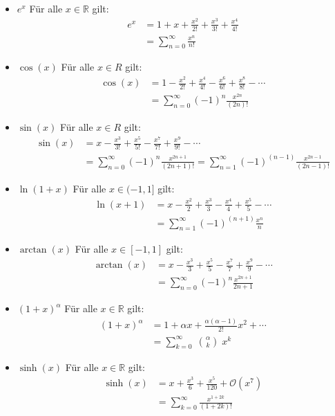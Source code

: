 \documentclass[25pt]{sciposter}
\newcommand{\R}{\mathbb{R}}
\begin{document}
\begin{multicols}{3}
\begin{itemize}
	\item $\boxed{e^x}$ Für alle $x \in \R$ gilt:
	\begin{align*}
		e^x &= 1 + x + \frac{x^2}{2!} + \frac{x^3}{3!} + \frac{x^4}{4!}\\
		&= \sum_{n=0}^{\infty} \frac{x^n}{n!}
	\end{align*}
	
	\item $\boxed{\cos(x)}$ Für alle $x\in R$ gilt:
	\begin{align*}
	\cos(x) &= 1 - \frac{x^2}{2!} + \frac{x^4}{4!} - \frac{x^6}{6!} + \frac{x^8}{8!} - \cdots  \\
	&= \sum_{n=0}^{\infty} (-1)^n \frac{x^{2n}}{(2n)!}
	\end{align*}
	
	\item $\boxed{\sin(x)}$ Für alle $x\in R$ gilt:
	\begin{align*}
	\sin(x) &=  x - \frac{x^3}{3!} + \frac{x^5}{5!} - \frac{x^7}{7!} + \frac{x^9}{9!} - \cdots\\
	&= \sum_{n=0}^{\infty} (-1)^n \frac{x^{2n+1}}{(2n+1)!} = \sum_{n=1}^{\infty} (-1)^{(n-1)} \frac{x^{2n-1}}{(2n-1)!}
	\end{align*}

	\item $\boxed{\ln(1+x)}$ Für alle $x\in (-1,1]$ gilt:
	\begin{align*}
	\ln(x+1) &= x - \frac{x^2}{2} + \frac{x^3}{3} - \frac{x^4}{4} + \frac{x^5}{5}- \cdots \\
	&= \sum_{n=1}^{\infty} (-1)^{(n+1)} \frac{x^n}{n}
	\end{align*}

	\item $\boxed{\arctan(x)}$ Für alle $x\in [-1,1]$ gilt:
	\begin{align*}
	\arctan(x) &= x - \frac{x^3}{3} + \frac{x^5}{5} - \frac{x^7}{7} + \frac{x^9}{9} - \cdots \\
	&= \sum_{n=0}^{\infty} (-1)^n \frac{x^{2n+1}}{2n+1}
	\end{align*}

	\item $\boxed{(1 + x)^\alpha}$ Für alle $x\in \R$ gilt:
	\begin{align*}
	(1 + x)^\alpha &=  1 + \alpha x + \frac{\alpha(\alpha-1)}{2!} x^2 + \cdots \\
	 &= \sum_{k=0}^{\infty} \; {\alpha \choose k} \; x^k 
	\end{align*}
	
	\item $\boxed{\sinh(x)}$ Für alle $x\in \R$ gilt:
	\begin{align*}
	\sinh(x) &= x + \frac{x^3}{6} + \frac{x^5}{120} + \mathcal{O}(x^7)\\
	&= \sum_{k=0}^{\infty}\frac{x^{1+2k}}{(1+2k)!}
	\end{align*}
	

\end{itemize}
\end{multicols}
\end{document}
